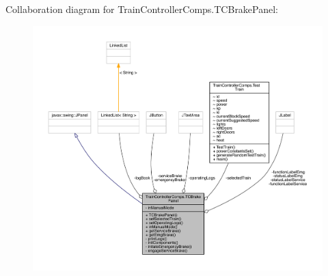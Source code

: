 Collaboration diagram for Train\+Controller\+Comps.\+T\+C\+Brake\+Panel\+:
\nopagebreak
\begin{figure}[H]
\begin{center}
\leavevmode
\includegraphics[width=350pt]{classTrainControllerComps_1_1TCBrakePanel__coll__graph}
\end{center}
\end{figure}
